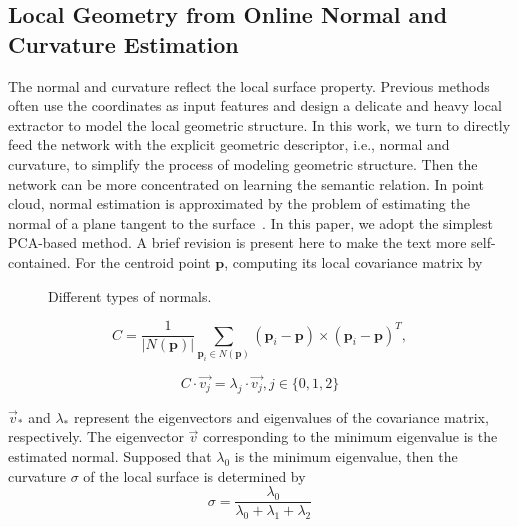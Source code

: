 \documentclass[journal]{IEEEtran}
\begin{document}
\subsection{Local Geometry from Online Normal and Curvature Estimation}
The normal and curvature reflect the local surface property. Previous methods often use the coordinates as input features and design a delicate and heavy local extractor to model the local geometric structure. In this work, we turn to directly feed the network with the explicit geometric descriptor, i.e., normal and curvature, to simplify the process of modeling geometric structure. Then the network can be more concentrated on learning the semantic relation. In point cloud, normal estimation is approximated by the problem of estimating the normal of a plane tangent to the surface~\cite{pcl}. In this paper, we adopt the simplest PCA-based method. A brief revision is present here to make the text more self-contained. For the centroid point $\mathbf{p}$, computing its local covariance matrix by

\begin{figure}[tbp]
\begin{center}
\end{center}
\vspace{-0.3cm}
   \caption{Different types of normals.}
\label{fig:normal}
\end{figure}


\begin{equation}
C = \frac{1}{|N(\mathbf{p})|}\sum_{\mathbf{p}_i\in N(\mathbf{p})}{(\mathbf{p}_i-\mathbf{p})\times(\mathbf{p}_i-\mathbf{p})^T},
\end{equation}

\begin{equation}
C\cdot \vec{v_{j}}=\lambda_j\cdot \vec{v_j}, j\in\{0,1,2\}
\end{equation}

\noindent
$\vec{v}_*$ and $\lambda_*$ represent the eigenvectors and eigenvalues of the covariance matrix, respectively. The eigenvector $\vec{v}$ corresponding to the minimum eigenvalue is the estimated normal. Supposed that $\lambda_0$ is the minimum eigenvalue, then the curvature $\sigma$ of the local surface is determined by 
\begin{equation}
\sigma = \frac{\lambda_0}{\lambda_0+\lambda_1+\lambda_2}
\end{equation}
\end{document}
